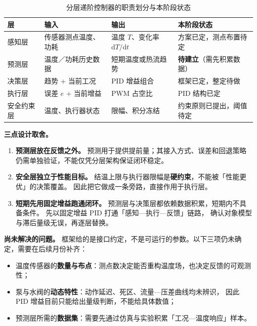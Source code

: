 \documentclass[stage2,fontset=fandol]{ydzjreport}
\begin{document}
	\begin{table}[H]
		\centering
		\caption{分层递阶控制器的职责划分与本阶段状态}
		\label{tab:layers}
		\begin{tabularx}{\textwidth}{@{}>{\RaggedRight\arraybackslash}p{} Y Y Y@{}}
			\toprule
{} 层 & 输入 & 输出 & 本阶段状态 \\
			\midrule
			感知层 & 传感器测点温度、功耗 & 温度 $T$、变化率 $\mathrm{d}T/\mathrm{d}t$ & 方案已定，测点布置待定 \\
			预测层 & 温度／功耗历史数据 & 短期温度或热流趋势 & \textbf{待建立}（需先积累数据） \\
			决策层 & 趋势 + 当前工况 & PID 增益组合 & 框架已定，整定待做 \\
			执行层 & 误差 $e$ + 当前增益 & PWM 占空比 & PID 结构已定 \\
			安全约束层 & 温度、执行器状态 & 限幅、积分冻结 & 约束原则已提出，阈值待定 \\
			\bottomrule
		\end{tabularx}
	\end{table}

	\textbf{三点设计取舍。}

	\begin{enumerate}
		\item \textbf{预测层放在反馈之外。}
		预测用于提供提前量；其接入方式、误差和回退策略仍需单独验证，不能仅凭分层架构保证闭环稳定。
		\item \textbf{安全层独立于性能目标。}
		结温上限与执行器限幅是\textbf{硬约束}，不能被「性能更优」的决策覆盖。
		因此把它做成一条旁路，直接作用于执行层。
		\item \textbf{短期先用固定增益跑通闭环。}
		预测层与决策层都依赖数据积累，短期内不具备条件。
		先以固定增益 PID 打通「感知—执行—反馈」链路，
		确认对象模型与滞后量级无误，再逐层替换。
	\end{enumerate}

	\textbf{尚未解决的问题。}
	框架给的是接口约定，不是可运行的参数。以下三项仍未确定，需要在后续月份补齐：

	\begin{itemize}
		\item 温度传感器的\textbf{数量与布点}：测点数决定能否重构温度场，也决定反馈的可观测性；
		\item 泵与水阀的\textbf{动态特性}：动作延迟、死区、流量—压差曲线均未辨识，
		因此 PID 增益目前只能给出量级判断，不能给具体数值；
		\item 预测层所需的\textbf{数据集}：需要先通过仿真与实验积累「工况—温度响应」样本。
	\end{itemize}
\end{document}
